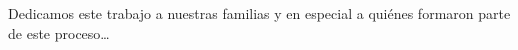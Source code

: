 \begin{dedicatoria} 

Dedicamos este trabajo a nuestras familias y en especial a quiénes formaron parte de este proceso\dots

\end{dedicatoria}
